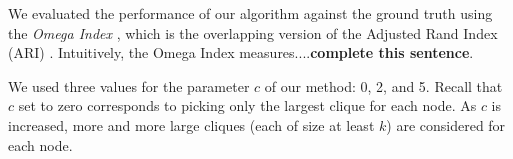 
%
%
%
%
%
%

We evaluated the performance of our algorithm against the ground truth 
using the {\it Omega Index} \cite{doi:10.1207/s15327906mbr2302_6}, 
which is the overlapping version of the Adjusted Rand Index (ARI) \cite{ARI_paper_1985}.
Intuitively, the Omega Index measures....{\bf complete this sentence}.

We used three values for the parameter $c$ of our method: 0, 2, and 5. 
Recall that $c$ set to zero corresponds to picking only the largest clique for each node. 
As $c$ is increased, more and more large cliques (each of size at least $k$)
are considered for each node. 

